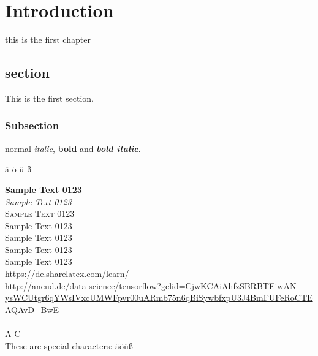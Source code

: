 \chapter{Introduction}

this is the first chapter

\section{section}

This is the first section.

\subsection{Subsection}

normal \emph{italic}, \textbf{bold} and \textbf{\emph{bold italic}}.

ä ö ü ß


{\textbf{Sample Text 0123}}
\\ %
{\textit{Sample Text 0123}}
\\ %
{\textsc{Sample Text 0123}}
\\ %
{\textsf{Sample Text 0123}}
\\ %
{\tiny{Sample Text 0123}}
\\ %
{\normalsize{Sample Text 0123}}
\\ %
{\huge{Sample Text 0123}}
\\ %
{\color{HyperlinkBlue}\url{https://de.sharelatex.com/learn/}}
\\
{\color{HyperlinkBlue}\url{http://ancud.de/data-science/tensorflow?gclid=CjwKCAiAhfzSBRBTEiwAN-ysWCUtgr6qYWsIVxcUMWFpvr00uARmb75n6qBiSywbfxpU3J4BmFUFeRoCTEAQAvD_BwE}}
\\
\\
A  C
\\
These are special characters: äöüß

